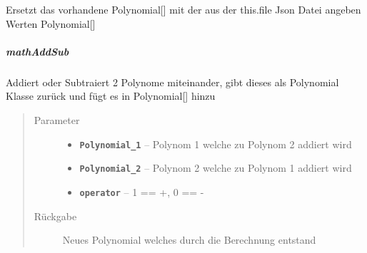 \documentclass[letterpaper,10pt,ngerman]{sphinxmanual}
\begin{document}
\begin{fulllineitems}
\label{com/linuxluigi/polynomial/PolynomialList:com.linuxluigi.polynomial.PolynomialList.load()}
Ersetzt das vorhandene Polynomial{[}{]} mit der aus der this.file Json Datei angeben Werten Polynomial{[}{]}

\end{fulllineitems}



\subparagraph{mathAddSub}
\label{com/linuxluigi/polynomial/PolynomialList:mathaddsub}

\begin{fulllineitems}
\label{com/linuxluigi/polynomial/PolynomialList:com.linuxluigi.polynomial.PolynomialList.mathAddSub(Polynomial, Polynomial, boolean)}
Addiert oder Subtraiert 2 Polynome miteinander, gibt dieses als Polynomial Klasse zurück und fügt es in Polynomial{[}{]} hinzu
\begin{quote}\begin{description}
\item[{Parameter}] \leavevmode\begin{itemize}
\item {} 
\textbf{\texttt{Polynomial\_1}} -- Polynom 1 welche zu Polynom 2 addiert wird

\item {} 
\textbf{\texttt{Polynomial\_2}} -- Polynom 2 welche zu Polynom 1 addiert wird

\item {} 
\textbf{\texttt{operator}} -- 1 == +, 0 == -

\end{itemize}

\item[{Rückgabe}] \leavevmode
Neues Polynomial welches durch die Berechnung entstand

\end{description}\end{quote}

\end{fulllineitems}
\end{document}
